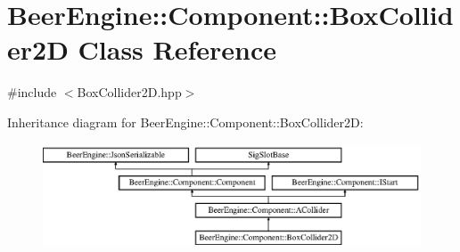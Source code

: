 \hypertarget{class_beer_engine_1_1_component_1_1_box_collider2_d}{}\section{Beer\+Engine\+:\+:Component\+:\+:Box\+Collider2D Class Reference}
\label{class_beer_engine_1_1_component_1_1_box_collider2_d}


{\ttfamily \#include $<$Box\+Collider2\+D.\+hpp$>$}

Inheritance diagram for Beer\+Engine\+:\+:Component\+:\+:Box\+Collider2D\+:\begin{figure}[H]
\begin{center}
\leavevmode
\includegraphics[height=3.085400cm]{class_beer_engine_1_1_component_1_1_box_collider2_d}
\end{center}
\end{figure}
